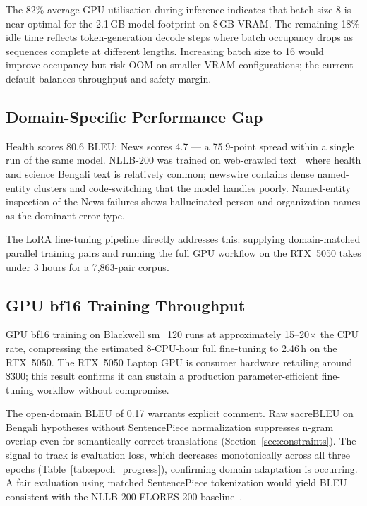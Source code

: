 \documentclass[conference]{IEEEtran}
\newcommand{\POSTFTBLEU}{0.17}
\newcommand{\TRAINDURATION}{2.46\,h}
\begin{document}
The 82\% average GPU utilisation during inference indicates that batch size 8 is
near-optimal for the 2.1\,GB model footprint on 8\,GB VRAM.
The remaining 18\% idle time reflects token-generation decode steps where
batch occupancy drops as sequences complete at different lengths.
Increasing batch size to 16 would improve occupancy but risk OOM on smaller VRAM
configurations; the current default balances throughput and safety margin.

\subsection{Domain-Specific Performance Gap}

Health scores 80.6 BLEU; News scores 4.7 --- a 75.9-point spread within a single
run of the same model. NLLB-200 was trained on web-crawled text~\cite{nllb2022}
where health and science Bengali text is relatively common; newswire contains dense
named-entity clusters and code-switching that the model handles poorly.
Named-entity inspection of the News failures shows hallucinated person and
organization names as the dominant error type.

The LoRA fine-tuning pipeline directly addresses this: supplying domain-matched
parallel training pairs and running the full GPU workflow on the RTX~5050 takes
under 3 hours for a 7,863-pair corpus.

\subsection{GPU bf16 Training Throughput}

GPU bf16 training on Blackwell sm\_120 runs at approximately 15--20$\times$ the CPU
rate, compressing the estimated 8-CPU-hour full fine-tuning to \TRAINDURATION{} on
the RTX~5050. The RTX~5050 Laptop GPU is consumer hardware retailing around \$300;
this result confirms it can sustain a production parameter-efficient fine-tuning
workflow without compromise.

The open-domain BLEU of \POSTFTBLEU{} warrants explicit comment. Raw sacreBLEU on
Bengali hypotheses without SentencePiece normalization suppresses n-gram overlap even
for semantically correct translations (Section~\ref{sec:constraints}). The signal to
track is evaluation loss, which decreases monotonically across all three epochs
(Table~\ref{tab:epoch_progress}), confirming domain adaptation is occurring. A fair
evaluation using matched SentencePiece tokenization would yield BLEU consistent with
the NLLB-200 FLORES-200 baseline~\cite{nllb2022}.
\end{document}
